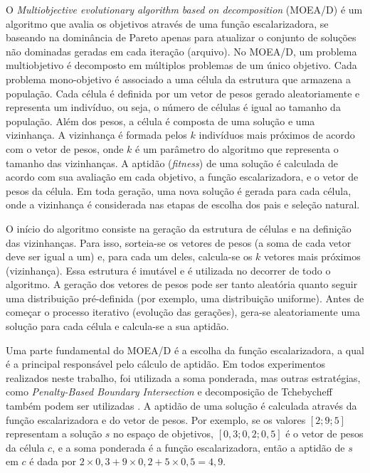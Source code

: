 O \textit{Multiobjective evolutionary algorithm based on decomposition} (MOEA/D) \cite{Zhang2007} é um algoritmo que avalia os objetivos através de uma função escalarizadora, se baseando na dominância de Pareto apenas para atualizar o conjunto de soluções não dominadas geradas em cada iteração (arquivo). No MOEA/D, um problema multiobjetivo é decomposto em múltiplos problemas de um único objetivo. Cada problema mono-objetivo é associado a uma célula da estrutura que armazena a população. Cada célula é definida por um vetor de pesos gerado aleatoriamente e representa um indivíduo, ou seja, o número de células é igual ao tamanho da população. Além dos pesos, a célula é composta de uma solução e uma vizinhança. A vizinhança é formada pelos $k$ indivíduos mais próximos de acordo com o vetor de pesos, onde $k$ é um parâmetro do algoritmo que representa o tamanho das vizinhanças. A aptidão (\textit{fitness}) de uma solução é calculada de acordo com sua avaliação em cada objetivo, a função escalarizadora, e o vetor de pesos da célula. Em toda geração, uma nova solução é gerada para cada célula, onde a vizinhança é considerada nas etapas de escolha dos pais e seleção natural.

O início do algoritmo consiste na geração da estrutura de células e na definição das vizinhanças. Para isso, sorteia-se os vetores de pesos (a soma de cada vetor deve ser igual a um) e, para cada um deles, calcula-se os $k$ vetores mais próximos (vizinhança). Essa estrutura é imutável e é utilizada no decorrer de todo o algoritmo. A geração dos vetores de pesos pode ser tanto aleatória quanto seguir uma distribuição pré-definida (por exemplo, uma distribuição uniforme). Antes de começar o processo iterativo (evolução das gerações), gera-se aleatoriamente uma solução para cada célula e calcula-se a sua aptidão. 

Uma parte fundamental do MOEA/D é a escolha da função escalarizadora, a qual é a principal responsável pelo cálculo de aptidão. Em todos experimentos realizados neste trabalho, foi utilizada a soma ponderada, mas outras estratégias, como \textit{Penalty-Based Boundary Intersection} e decomposição de Tchebycheff também podem ser utilizadas \cite{Zhang2007}. A aptidão de uma solução é calculada através da função escalarizadora e do vetor de pesos. Por exemplo, se os valores $[2; 9; 5]$ representam a solução $s$ no espaço de objetivos, $[0,3; 0,2; 0,5]$ é o vetor de pesos da célula $c$, e a soma ponderada é a função escalarizadora, então a aptidão de $s$ em $c$ é dada por $2 \times 0,3 + 9 \times 0,2 + 5 \times 0,5 = 4,9$.

